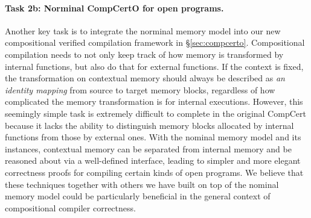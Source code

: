 \paragraph*{Task 2b: Norminal CompCertO for open programs.}
Another key task is to integrate the norminal memory model into our
new compositional verified compilation framework in
\S\ref{sec:compcerto}.  Compositional compilation needs to not only
keep track of how memory is transformed by internal functions, but
also do that for external functions.  If the context is fixed, the
transformation on contextual memory should always be described as
\emph{an identity mapping} from source to target memory blocks,
regardless of how complicated the memory transformation is for
internal executions.  However, this seemingly simple task is extremely
difficult to complete in the original CompCert because it lacks the
ability to distinguish memory blocks allocated by internal functions
from those by external ones. With the nominal memory model and its
instances, contextual memory can be separated from internal memory and
be reasoned about via a well-defined interface, leading to simpler and
more elegant correctness proofs for compiling certain kinds of open
programs. We believe that these techniques together with others we
have built on top of the nominal memory model could be particularly
beneficial in the general context of compositional compiler
correctness.

